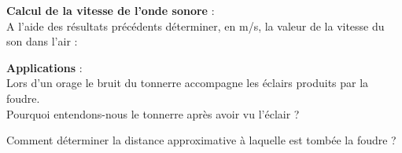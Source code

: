 \documentclass[11pt,a4paper]{article}
\newcommand{\cadreblanc}[1]{%
\medskip\framebox[\linewidth][c]{%
\rule{0mm}{#1mm}}\par
\medskip}
\begin{document}
\vfill 

 \textbf{Calcul de la vitesse de l'onde sonore} : \\[2pt]
A l'aide des résultats précédents déterminer, en m/s, la valeur de la vitesse du son dans l'air :\\[2pt]
\cadreblanc{29}

\vfill 

 \textbf{Applications} : \\[2pt]
Lors d'un orage le bruit du tonnerre accompagne les éclairs produits par la foudre.\\
Pourquoi entendons-nous le tonnerre après avoir vu l'éclair ? \\[10pt]
\dotfill

\vspace{10pt}

\dotfill

\vfill 

Comment déterminer la distance approximative à laquelle est tombée la foudre ? \\[10pt] 
\dotfill

\vspace{10pt}

\dotfill

\vfill
\end{document}
